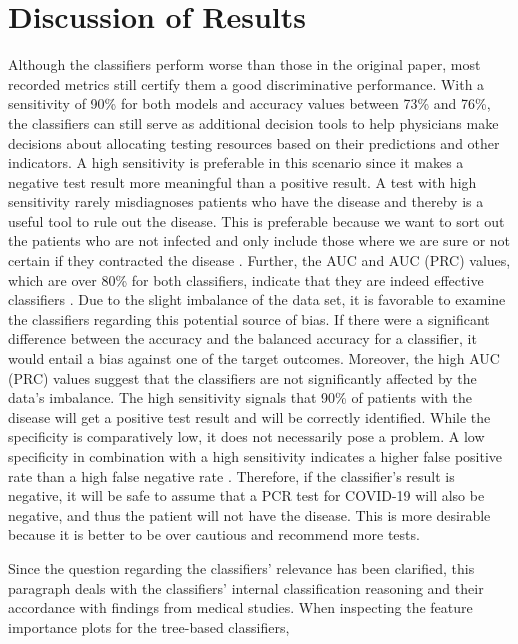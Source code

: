 \section{Discussion of Results}
Although the classifiers perform worse than those in the original paper, 
most recorded metrics still certify them a good discriminative performance.
With a sensitivity of 90\% for both models and accuracy values between 73\% and 
76\%, the classifiers can still serve as additional decision tools to help 
physicians make decisions about allocating testing resources based on their 
predictions and other indicators. 
A high sensitivity is preferable in this scenario since it makes a negative test 
result more meaningful than a positive result. A test with high sensitivity 
rarely misdiagnoses patients who have the disease and thereby is a useful tool 
to rule out the disease. This is preferable because we want to sort out the 
patients who are not infected and only include those where we are sure or not 
certain if they contracted the disease \cite{RN168}.
Further, the AUC and AUC (PRC) values, which are over 80\% 
for both classifiers, indicate that they are indeed effective classifiers 
\cite{RN167}.
Due to the slight imbalance of the data set, it is  favorable to examine the 
classifiers regarding this potential source of bias. If there were a 
significant difference between the accuracy and the balanced accuracy for a 
classifier, it 
would entail a bias against one of the target outcomes. Moreover, the high AUC 
(PRC) values suggest that the classifiers are not significantly affected by the 
data's imbalance.
The high sensitivity signals that 90\% of 
patients with the disease will get a positive test result and will be correctly 
identified. 
While the specificity is comparatively low, it does not necessarily pose a 
problem. A low specificity in combination with a high sensitivity indicates a 
higher false positive rate than a high false negative rate \cite{RN168}.
Therefore, if the classifier's result is negative, it will be safe to 
assume that a PCR test for COVID-19 will also be negative, and thus the patient 
will not have the disease.
This is more desirable because it is better to be over cautious and recommend 
more tests.
\par
Since the question regarding the classifiers' relevance has been 
clarified, this paragraph deals with the classifiers' internal classification 
reasoning and their accordance with findings from medical studies.
When inspecting the feature importance plots for the tree-based classifiers, 
